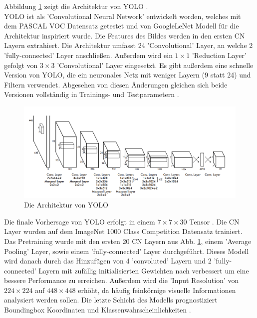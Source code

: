 {{	Abbildung \ref{YOLO_Architecture} zeigt die Architektur von YOLO \citep{Redmon2016}. \\
	YOLO ist als 'Convolutional Neural Network' entwickelt worden, welches mit dem PASCAL VOC Datensatz getestet und von GoogleLeNet Modell für die Architektur inspiriert wurde. Die Features des Bildes werden in den ersten CN Layern extrahiert. Die Architektur umfasst 24 'Convolutional' Layer, an welche 2 'fully-connected' Layer anschließen. Außerdem wird ein $1 \times 1$ 'Reduction Layer' gefolgt von $3 \times 3$ 'Convolutional' Layer eingesetzt. Es gibt außerdem eine schnelle Version von YOLO, die ein neuronales Netz mit weniger Layern (9 statt 24) und Filtern verwendet. Abgesehen von diesen Änderungen gleichen sich beide Versionen vollständig in Trainings- und Testparametern \citep{Redmon2016}. \\
	\begin{figure}[h]
		\centering
		\includegraphics*[scale = 1.5, keepaspectratio]{images/YOLO/YOLO_network_arch.png}
		\caption[Die Architektur von YOLO]{Die Architektur von YOLO\citep{Redmon2016}}
		\label{YOLO_Architecture}
 	\end{figure}
	Die finale Vorhersage von YOLO erfolgt in einem $7 \times 7 \times 30$ Tensor \citep{Redmon2016}.
	Die CN Layer wurden auf dem \glqq ImageNet 1000 Class Competition \grqq{} Datensatz trainiert. Das Pretraining wurde mit den ersten 20 CN Layern aus Abb. \ref{YOLO_Architecture}, einem 'Average Pooling' Layer, sowie einem 'fully-connected' Layer durchgeführt. Dieses Modell wird danach durch das Hinzufügen von 4 'convoluted' Layern und 2 'fully-connected' Layern mit zufällig initialisierten Gewichten nach \cite{Ren2017}  \citep{Ren2017} verbessert um eine bessere Performance zu erreichen. Außerdem wird die 'Input Resolution' von $224 \times 224$ auf $448  \times  448$ erhöht, da häufig feinkörnige visuelle Informationen analysiert werden sollen. Die letzte Schicht des Modells prognostiziert Boundingbox Koordinaten und Klassenwahrscheinlichkeiten \citep{Redmon2016}. \\
}}
